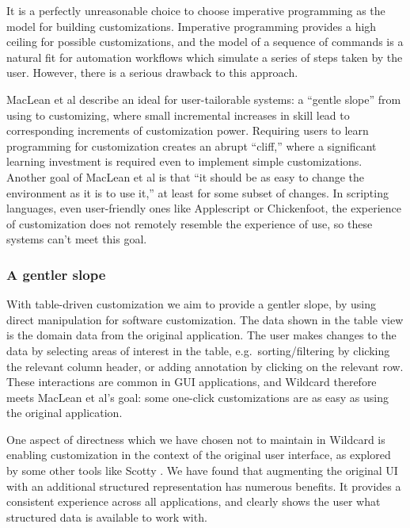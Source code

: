 \documentclass[sigplan,10pt,anonymous,review]{acmart}
\begin{document}
It is a perfectly unreasonable choice to choose imperative programming
as the model for building customizations. Imperative programming
provides a high ceiling for possible customizations, and the model of a
sequence of commands is a natural fit for automation workflows which
simulate a series of steps taken by the user. However, there is a
serious drawback to this approach.

MacLean et al \citep{maclean1990} describe an ideal for user-tailorable
systems: a ``gentle slope'' from using to customizing, where small
incremental increases in skill lead to corresponding increments of
customization power. Requiring users to learn programming for
customization creates an abrupt ``cliff,'' where a significant learning
investment is required even to implement simple customizations. Another
goal of MacLean et al is that ``it should be as easy to change the
environment as it is to use it,'' at least for some subset of changes.
In scripting languages, even user-friendly ones like Applescript or
Chickenfoot, the experience of customization does not remotely resemble
the experience of use, so these systems can't meet this goal.

\hypertarget{a-gentler-slope}{%
\subsubsection{A gentler slope}\label{a-gentler-slope}}

With table-driven customization we aim to provide a gentler slope, by
using direct manipulation for software customization. The data shown in
the table view is the domain data from the original application. The
user makes changes to the data by selecting areas of interest in the
table, e.g.~sorting/filtering by clicking the relevant column header, or
adding annotation by clicking on the relevant row. These interactions
are common in GUI applications, and Wildcard therefore meets MacLean et
al's goal: some one-click customizations are as easy as using the
original application.

One aspect of directness which we have chosen not to maintain in
Wildcard is enabling customization in the context of the original user
interface, as explored by some other tools like Scotty
\citep{eagan2011}. We have found that augmenting the original UI with an
additional structured representation has numerous benefits. It provides
a consistent experience across all applications, and clearly shows the
user what structured data is available to work with.
\end{document}
